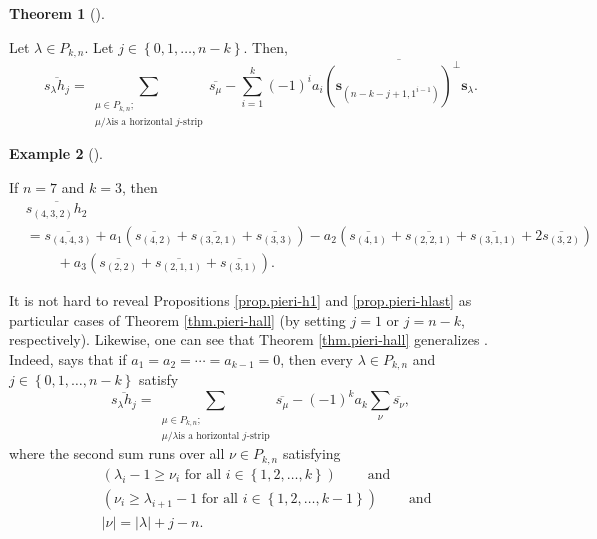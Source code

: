 \documentclass[numbers=enddot,12pt,final,onecolumn,notitlepage]{scrartcl}%
\theoremstyle{definition}
\newtheorem{theo}{Theorem}[section]
\newenvironment{theorem}[1][]
{\begin{theo}[#1]\begin{leftbar}}
{\end{leftbar}\end{theo}}
\newtheorem{exmp}[theo]{Example}
\newenvironment{example}[1][]
{\begin{exmp}[#1]\begin{leftbar}}
{\end{leftbar}\end{exmp}}
\let\sumnonlimits\sum
\renewcommand{\sum}{\sumnonlimits\limits}
\begin{document}
\begin{theorem}
\label{thm.pieri-hall}Let $\lambda\in P_{k,n}$. Let $j\in\left\{
0,1,\ldots,n-k\right\}  $. Then,%
\[
\overline{s_{\lambda}h_{j}}=\sum_{\substack{\mu\in P_{k,n};\\\mu/\lambda\text{
is a horizontal }j\text{-strip}}}\overline{s_{\mu}}-\sum_{i=1}^{k}\left(
-1\right)  ^{i}a_{i}\overline{\left(  \mathbf{s}_{\left(  n-k-j+1,1^{i-1}%
\right)  }\right)  ^{\perp}\mathbf{s}_{\lambda}}.
\]

\end{theorem}

\begin{example}
\label{exa.pieri-hall.73}If $n=7$ and $k=3$, then%
\begin{align*}
&  \overline{s_{\left(  4,3,2\right)  }h_{2}}\\
&  =\overline{s_{\left(  4,4,3\right)  }}+a_{1}\left(  \overline{s_{\left(
4,2\right)  }}+\overline{s_{\left(  3,2,1\right)  }}+\overline{s_{\left(
3,3\right)  }}\right)  -a_{2}\left(  \overline{s_{\left(  4,1\right)  }%
}+\overline{s_{\left(  2,2,1\right)  }}+\overline{s_{\left(  3,1,1\right)  }%
}+2\overline{s_{\left(  3,2\right)  }}\right) \\
&  \ \ \ \ \ \ \ \ \ \ +a_{3}\left(  \overline{s_{\left(  2,2\right)  }%
}+\overline{s_{\left(  2,1,1\right)  }}+\overline{s_{\left(  3,1\right)  }%
}\right)  .
\end{align*}

\end{example}

It is not hard to reveal Propositions \ref{prop.pieri-h1} and
\ref{prop.pieri-hlast} as particular cases of Theorem \ref{thm.pieri-hall} (by
setting $j=1$ or $j=n-k$, respectively). Likewise, one can see that Theorem
\ref{thm.pieri-hall} generalizes \cite[(22)]{BeCiFu99}. Indeed, \cite[(22)]%
{BeCiFu99} says that if $a_{1}=a_{2}=\cdots=a_{k-1}=0$, then every $\lambda\in
P_{k,n}$ and $j\in\left\{  0,1,\ldots,n-k\right\}  $ satisfy%
\[
\overline{s_{\lambda}h_{j}}=\sum_{\substack{\mu\in P_{k,n};\\\mu/\lambda\text{
is a horizontal }j\text{-strip}}}\overline{s_{\mu}}-\left(  -1\right)
^{k}a_{k}\sum_{\nu}\overline{s_{\nu}},
\]
where the second sum runs over all $\nu\in P_{k,n}$ satisfying
\begin{align*}
&  \left(  \lambda_{i}-1\geq\nu_{i}\text{ for all }i\in\left\{  1,2,\ldots
,k\right\}  \right)  \ \ \ \ \ \ \ \ \ \ \text{and}\\
&  \left(  \nu_{i}\geq\lambda_{i+1}-1\text{ for all }i\in\left\{
1,2,\ldots,k-1\right\}  \right)  \ \ \ \ \ \ \ \ \ \ \text{and}\\
&  \left\vert \nu\right\vert =\left\vert \lambda\right\vert +j-n.
\end{align*}
\end{document}
